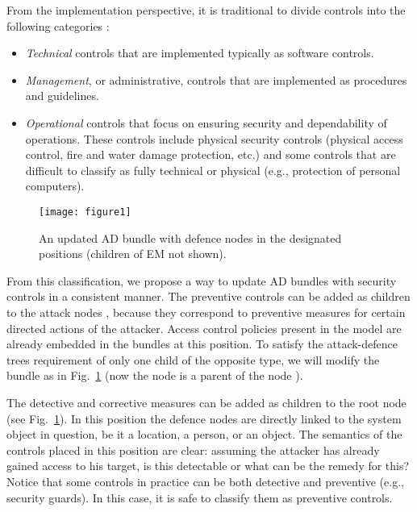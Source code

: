 \documentclass{llncs}
\begin{document}
From the implementation perspective, it is traditional to divide controls into the following categories \cite{NIST-800-30}:
\begin{itemize}
\item \emph{Technical} controls that are implemented typically as software controls.
\item \emph{Management}, or administrative, controls that are implemented as procedures and guidelines.
\item \emph{Operational} controls that focus on ensuring security and dependability of operations. These controls include physical security controls (physical access control, fire and water damage protection, etc.) and some controls that are difficult to classify as fully technical or physical (e.g., protection of personal computers).   	
\end{itemize}



\begin{figure}[htb]
\centering
\texttt{[image: figure1]}
\caption{An updated AD bundle with defence nodes in the designated positions (children of EM not shown).}
\label{fig:updatedbundle}
\end{figure}


From this classification, we propose a way to update AD bundles with security controls in a consistent manner. The preventive controls can be added as children to the attack nodes \taccfrom, because they correspond to preventive measures for certain directed actions of the attacker. Access control policies present in the model are already embedded in the bundles at this position. To satisfy the attack-defence trees requirement of only one child of the opposite type, we will modify the bundle as in Fig.~\ref{fig:updatedbundle} (now the node \tpreventive is a parent of the node \tdefence). 

The detective and corrective measures can be added as children to the root node \taccess (see Fig.~\ref{fig:updatedbundle}). In this position the defence nodes are directly linked to the system object in question, be it a location, a person, or an object. The semantics of the controls placed in this position are clear: assuming the attacker has already gained access to his target, is this detectable or what can be the remedy for this? Notice that some controls in practice can be both detective and preventive (e.g., security guards). In this case, it is safe to classify them as preventive controls.
\end{document}
